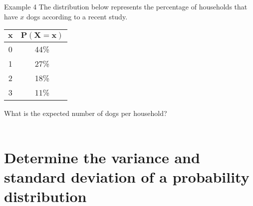 \documentclass[t]{beamer}
\begin{document}
\begin{frame}{Example 4}
The distribution below represents the percentage of households that have $x$ dogs according to a recent study. \newline
\begin{center}
\begin{tabular}{c|c}
$\bm{x}$ & $\bm{P(X=x)}$ \\ \hline
0 & 44\% \\
1 & 27\% \\
2 & 18\% \\
3 & 11\%
\end{tabular}
\end{center}
What is the expected number of dogs per household?	\newline\\
	\newline\\
\end{frame}

\section{Determine the variance and standard deviation of a probability distribution}
\end{document}
